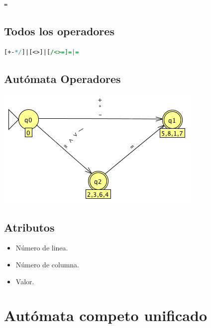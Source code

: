             \begin{lstlisting}[language=Perl]
=
            \end{lstlisting}

        \subsection{Todos los operadores}

            \begin{lstlisting}[language=Perl]
[+-*/]|[<>]|[/<>=]=|=
            \end{lstlisting}

        \subsection{Autómata Operadores}

            \includegraphics[scale=.7]{../Design/jflap/Operadores.png}

        \subsection{Atributos}

            \begin{itemize}
                \item Número de linea.
                \item Número de columna.
                \item Valor.
            \end{itemize}

            \hfill
            \clearpage



\section{Autómata competo unificado}

